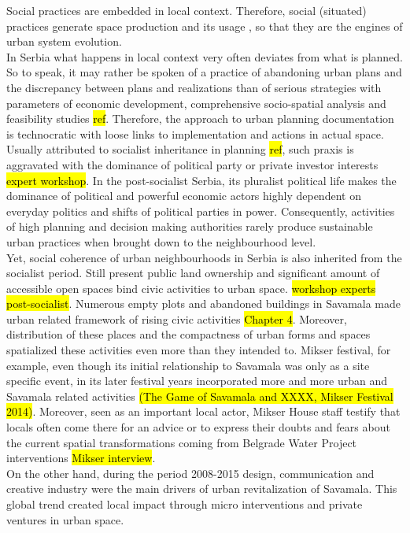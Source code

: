 \documentclass[11pt]{report}
\begin{document}
Social practices are embedded in local context. Therefore, social (situated) practices generate space production and its usage \cite{Holanda 2011}, so that they are the engines of urban system evolution.
\\
In Serbia what happens in local context very often deviates from what is planned. So to speak, it may rather be spoken of a practice of abandoning urban plans and the discrepancy between plans and realizations than of serious strategies with parameters of economic development, comprehensive socio-spatial analysis and feasibility studies \hl{ref}.
Therefore, the approach to urban planning documentation is technocratic with loose links to implementation and actions in actual space.
Usually attributed to socialist inheritance in planning \hl{ref}, such praxis is aggravated with the dominance of political party or private investor interests \hl{expert workshop}. In the post-socialist Serbia, its pluralist political life makes the dominance of political and powerful economic actors highly dependent on everyday politics and shifts of political parties in power.
Consequently, activities of high planning and decision making authorities rarely produce sustainable urban practices when brought down to the neighbourhood level.
\\
Yet, social coherence of urban neighbourhoods in Serbia is also inherited from the socialist period.
Still present public land ownership and significant amount of accessible open spaces bind civic activities to urban space. \hl{workshop experts post-socialist}. 
Numerous empty plots and abandoned buildings in Savamala made urban related framework of rising civic activities \hl{Chapter 4}. Moreover, distribution of these places and the compactness of urban forms and spaces spatialized these activities even more than they intended to.
Mikser festival, for example, even though its initial relationship to Savamala was only as a site specific event, in its later festival years incorporated more and more urban and Savamala related activities \hl{(The Game of Savamala and XXXX, Mikser Festival 2014)}. Moreover, seen as an important local actor, Mikser House staff testify that locals often come there for an advice or to express their doubts and fears about the current spatial transformations coming from Belgrade Water Project interventions \hl{Mikser interview}.
\\
On the other hand, during the period 2008-2015 design, communication and creative industry were the main drivers of urban revitalization of Savamala.
This global trend created local impact through micro interventions and private ventures in urban space.
\end{document}
